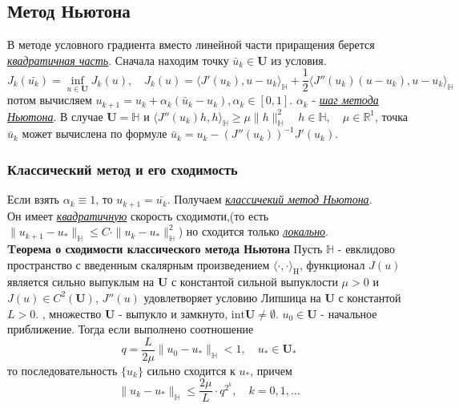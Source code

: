 \documentclass[A4]{article}
\begin{document}
\subsection{Метод Ньютона}
В методе условного градиента вместо линейной части приращения берется \underline{\emph{квадратичная часть}}. Сначала находим точку $\bar{u}_k\in\mathbf{U}$ из условия.
\begin{equation*}
 J_k(\bar{u_k})=\inf_{u\in\mathbf{U}}J_k(u),\quad J_k(u)=\langle J'(u_k),u-u_k\rangle_{\mathbb{H}}+\frac{1}{2}\langle J''(u_k)(u-u_k),u-u_k\rangle_{\mathbb{H}}
\end{equation*}
потом вычисляем $u_{k+1}=u_k+\alpha_{k}(\bar{u}_k-u_k),\alpha_{k}\in[0,1]$. $\alpha_{k}$ - \underline{\emph{шаг метода Ньютона}}. В случае $\mathbf{U}=\mathbb{H}$ и $\langle J''(u_k)h,h\rangle_{\mathbb{H}}\geqslant\mu\|h\|^2_{\mathbb{H}}\quad h\in\mathbb{H},\quad\mu\in\mathbb{R}^1$, точка $\bar{u}_k$ может вычислена по формуле $\bar{u}_k=u_k-(J''(u_k))^{-1}J'(u_k)$.
\subsubsection{Классический метод и его сходимость}
Если взять $\alpha_{k}\equiv 1$, то $u_{k+1}=\bar{u_k}$. Получаем \underline{\emph{классичекий метод Ньютона}}. \\
Он имеет \underline{\emph{квадратичную}} скорость сходимоти,(то есть $\|u_{k+1}-u_*\|_{\mathbb{H}} \leqslant C\cdot\|u_k-u_*\|^2_{\mathbb{H}}$) но сходится только \underline{\emph{локально}}. \\
\textbf{Tеорема о сходимости классического метода Ньютона} Пусть $\mathbb{H}$ - евклидово пространство с введенным скалярным произведением $ \langle\cdot, \cdot\rangle_{\mathrm{H}}$, функционал $ J(u) $ является сильно выпуклым на $ \mathbf{U} $ с константой сильной выпуклости $ \mu>0 $ и $ J(u) \in C^{2}(\mathbf{U})$, $ J''(u)$ удовлетворяет условию Липшица на $\mathbf{U}$ с константой $ L>0$. , множество $ \mathbf{U}$ - выпукло и замкнуто, $\text{int}\mathbf{U}\ne\emptyset.$ $u_0\in\mathbf{U}$ - начальное приближение. Тогда если выполнено соотношение
\begin{equation*}
q=\frac{L}{2\mu}\|u_0-u_*\|_{\mathbb{H}}<1,\quad u_*\in\mathbf{U}_*
\end{equation*} 
то последовательность $\{u_k \}$ сильно сходится к $u_*$, причем
\begin{equation*}
\|u_k-u_*\|_{\mathbb{H}}\leqslant\frac{2\mu}{L}\cdot q^{2^k},\quad k=0,1,\ldots
\end{equation*}
\end{document}
